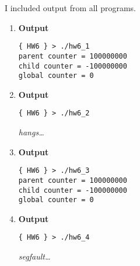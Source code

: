 \documentclass[letterpaper]{article}
\begin{document}
I included output from all programs.
\begin{enumerate}
    \item \textbf{Output}
    \begin{verbatim}
{ HW6 } > ./hw6_1
parent counter = 100000000
child counter = -100000000
global counter = 0
    \end{verbatim}
    \item \textbf{Output}
    \begin{verbatim}
{ HW6 } > ./hw6_2
    \end{verbatim}
    \textit{hangs\ldots}
    \item \textbf{Output}
    \begin{verbatim}
{ HW6 } > ./hw6_3
parent counter = 100000000
child counter = -100000000
global counter = 0
    \end{verbatim}
    \item \textbf{Output}
    \begin{verbatim}
{ HW6 } > ./hw6_4
    \end{verbatim}
    \textit{segfault\ldots}
\end{enumerate}
\end{document}

